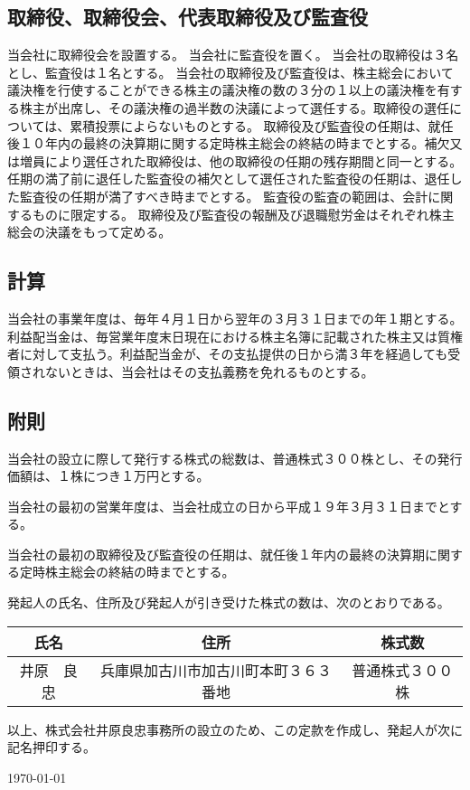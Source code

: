 \documentclass[10pt,a4paper,uplatex]{jsarticle}
\begin{document}
\subsection{取締役、取締役会、代表取締役及び監査役}
当会社に取締役会を設置する。
当会社に監査役を置く。
当会社の取締役は３名とし、監査役は１名とする。
当会社の取締役及び監査役は、株主総会において議決権を行使することができる株主の議決権の数の３分の１以上の議決権を有する株主が出席し、その議決権の過半数の決議によって選任する。取締役の選任については、累積投票によらないものとする。
取締役及び監査役の任期は、就任後１０年内の最終の決算期に関する定時株主総会の終結の時までとする。補欠又は増員により選任された取締役は、他の取締役の任期の残存期間と同一とする。任期の満了前に退任した監査役の補欠として選任された監査役の任期は、退任した監査役の任期が満了すべき時までとする。
監査役の監査の範囲は、会計に関するものに限定する。 
取締役及び監査役の報酬及び退職慰労金はそれぞれ株主総会の決議をもって定める。


\subsection{計算}
当会社の事業年度は、毎年４月１日から翌年の３月３１日までの年１期とする。
利益配当金は、毎営業年度末日現在における株主名簿に記載された株主又は質権者に対して支払う。利益配当金が、その支払提供の日から満３年を経過しても受領されないときは、当会社はその支払義務を免れるものとする。

\subsection{附則}
当会社の設立に際して発行する株式の総数は、普通株式３００株とし、その発行価額は、１株につき１万円とする。

当会社の最初の営業年度は、当会社成立の日から平成１９年３月３１日までとする。

当会社の最初の取締役及び監査役の任期は、就任後１年内の最終の決算期に関する定時株主総会の終結の時までとする。

発起人の氏名、住所及び発起人が引き受けた株式の数は、次のとおりである。
\begin{table}[h]
\begin{tabular}{|c|c|c|}\hline
氏名        &  住所                                  & 株式数             \\ \hline
井原　良忠  & 兵庫県加古川市加古川町本町３６３番地   & 普通株式３００株   \\ \hline
\end{tabular}
\end{table}

\vspace{20pt}
以上、株式会社井原良忠事務所の設立のため、この定款を作成し、発起人が次に記名押印する。
\begin{flushleft} 
\today\\
\vspace{10pt}
\MakeSignatureField
\end{flushleft}
\end{document}
